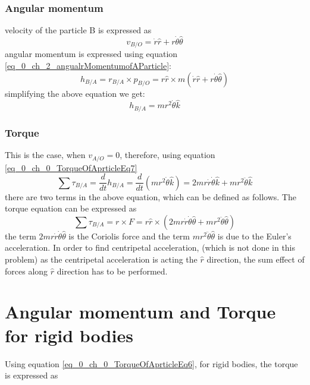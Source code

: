 \subsubsection{Angular momentum}
velocity of the particle B is expressed as
\begin{equation}
	v_{B/O} = \dot{r}\hat{r} + r \dot{\theta} \hat{\theta}
\end{equation}
angular momentum is expressed using equation \eqref{eq_0_ch_2_angualrMomentumofAParticle}:
\begin{equation}
	h_{B/A} = r_{B/A} \times p_{B/O} = r \hat{r} \times m \left( \dot{r}\hat{r} + r \dot{\theta} \hat{\theta} \right)
\end{equation}
simplifying the above equation we get:
\begin{equation}
	h_{B/A} = m r^{2} \dot{\theta} \hat{k}
\end{equation} 

\subsubsection{Torque}

This is the case, when $v_{A/O} = 0$, therefore, using equation \eqref{eq_0_ch_0_TorqueOfAprticleEq7}
\begin{equation}
\sum \tau_{B/A} = \frac{d}{dt} h_{B/A} = \frac{d}{dt} \left( m r^{2} \dot{\theta} \hat{k} \right) = 2mr\dot{r}\dot{\theta}\hat{k} + m r^{2} \ddot{\theta} \hat{k}
\end{equation}
there are two terms in the above equation, which can be defined as follows. The torque equation can be expressed as
\begin{equation}
	\sum \tau_{B/A} = r \times F = r \hat{r} \times \left( 2mr\dot{r}\dot{\theta} \hat{\theta} + m r^{2} \ddot{\theta} \hat{\theta} \right)
\end{equation}
the term $2mr\dot{r}\dot{\theta} \hat{\theta}$ is the Coriolis force and the term $m r^{2} \ddot{\theta} \hat{\theta}$ is due to the Euler's acceleration. In order to find centripetal acceleration, (which is not done in this problem) as the centripetal acceleration is acting the $\hat{r}$ direction, the sum effect of forces along $\hat{r}$ direction has to be performed.

\section{Angular momentum and Torque for rigid bodies}

Using equation \eqref{eq_0_ch_0_TorqueOfAprticleEq6}, for rigid bodies, the torque is expressed as 

